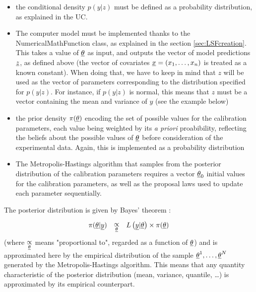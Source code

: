\begin{itemize}
\item the conditional density $p(y|z)$ must be defined as a probability distribution, as explained in the UC.%
\item The computer model must be implemented thanks to the NumericalMathFunction class, as explained in the section \ref{sec:LSFcreation}. This takes a value of ${\underline{\theta}}$ as input, and outputs the vector of model predictions ${\underline{z}}$, as defined above (the vector of covariates ${\underline{x}} = (x_1, \ldots, x_n)$ is treated as a known constant). When doing that, we have to keep in mind that $z$ will be used as the vector of parameters corresponding to the distribution specified for $p(y |z)$. For instance, if $p(y|z)$ is normal, this means that $z$ must be a vector containing the mean and variance of $y$ (see the example below)
\item the prior density $\pi({\underline{\theta}})$ encoding the set of possible values for the calibration parameters, each value being weighted by its {\em a priori} proabibility, reflecting the beliefs about the possible values of ${\underline{\theta}}$ before consideration of the experimental data. Again, this is implemented as a probability distribution
\item The Metropolis-Hastings algorithm that samples from the posterior distribution of the calibration parameters requires a vector ${\underline{\theta}}_0$ initial values for the calibration parameters, as well as the proposal laws used to update each parameter sequentially.
\end{itemize}

The posterior distribution is given by Bayes' theorem :
\begin{align*}
  \pi({\underline{\theta}} | {\underline{y}})
  \quad \substack{~\\[0.5em]\displaystyle\propto\\\scriptstyle{\underline{\theta}}} \quad
  L\left({\underline{y}} | {\underline{\theta}}\right) \times \pi({\underline{\theta}})
\end{align*}
(where $\substack{~\\[0.5em]\displaystyle\propto\\\scriptstyle{\underline{\theta}}}$
means "proportional to", regarded as a function of ${\underline{\theta}}$)
and is approximated here by the empirical distribution of the sample ${\underline{\theta}}^1, \ldots, {\underline{\theta}}^N$ generated by the Metropolis-Hastings algorithm. This means that any quantity characteristic of the posterior distribution (mean, variance, quantile, \ldots) is approximated by its empirical counterpart.

